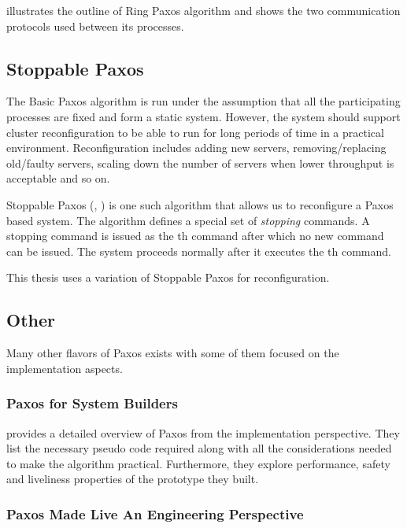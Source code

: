  illustrates the outline of Ring Paxos algorithm and
shows the two communication protocols used between its processes.

\subsection{Stoppable Paxos}

The Basic Paxos algorithm is run under the assumption that all the participating
processes are fixed and form a static system. However, the system should
support cluster reconfiguration to be able to run for long periods of time in a
practical environment. Reconfiguration includes adding new servers,
removing/replacing old/faulty servers, scaling down the number of servers
when lower throughput is acceptable and so on.

Stoppable Paxos (\citet{LamportSP08}, \citet{LamportMZ10}) is one such algorithm
that allows us to reconfigure a Paxos based system. The algorithm defines a
special set of \emph{stopping} commands. A stopping command is issued as the
th command after which no new command  can be issued. The
system proceeds normally after it executes the th command.

This thesis uses a variation of Stoppable Paxos for reconfiguration.

\subsection{Other}

Many other flavors of Paxos exists with some of them focused on the
implementation aspects.

\subsubsection{Paxos for System Builders}

\citet{Kirsch08paxosfor} provides a detailed overview of Paxos from the
implementation perspective. They list the necessary pseudo code required
along with all the considerations needed to make the algorithm practical.
Furthermore, they explore performance, safety and liveliness 
properties of the prototype they built.

\subsubsection{Paxos Made Live \dash{} An Engineering Perspective}

